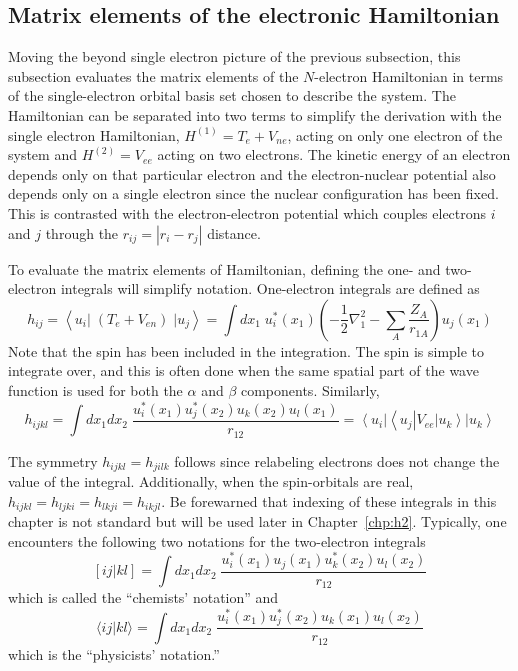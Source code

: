 \documentclass[11pt,oneside,final]{huthesis}%
\begin{document}
\subsection{Matrix elements of the electronic Hamiltonian}

Moving the beyond single electron picture of the previous subsection, this subsection evaluates the matrix elements of the $N$-electron Hamiltonian in terms of the single-electron orbital basis set chosen to describe the system.    The Hamiltonian can be separated into two terms to simplify the derivation with the single electron Hamiltonian, $H^{(1)} = T_{e} + V_{ne }$, acting on only one electron of the system and $H^{(2)} = V_{ee}$ acting on two electrons.  The kinetic energy of an electron depends only on that particular electron and the electron-nuclear potential also depends only on a single electron since the nuclear configuration has been fixed.  This is contrasted with the electron-electron potential which couples electrons $i$ and $j$ through the ${r}_{ij}=|r_i-r_j|$ distance.



To evaluate the matrix elements of Hamiltonian, defining the one- and two-electron integrals will simplify notation.  One-electron integrals are defined as 
\begin{equation} \label{GrindEQ__7_9_} 
h_{ij} =\left\langle u_{i} \left|\; \left(T_{e} +V_{en} \right)\; \right|u_{j} \right\rangle =\int  dx_{1} \; u_{i}^{*} (x_{1} )\left(-\frac{1}{2} \nabla _{1}^{2} -\sum _{A} \frac{Z_{A} }{r_{1A} } \right)u_{j} (x_{1} )
\end{equation} 
Note that the spin has been included in the integration.  The spin is simple to integrate over, and this is often done when the same spatial part of the wave function is used for both the $\alpha$ and $\beta$ components.  Similarly,
\begin{equation} \label{GrindEQ__7_10_} 
h_{ijkl} =\int  dx_{1} dx_{2} \; \frac{u_{i}^{*} (x_{1} )u_{j}^{*} (x_{2} )  u_{k} (x_{2} )u_{l} (x_{1} )}{r_{12} } ={\left\langle u_{i}  \right|} {\left\langle u_{j}  \right|} V_{ee} {\left| u_{k}  \right\rangle} {\left| u_{k}  \right\rangle} 
\end{equation} 


The symmetry $h_{ijkl} =h_{jilk}$ follows since relabeling electrons does not change the value of the integral. Additionally, when the spin-orbitals are real, $h_{ijkl}=h_{ljki}=h_{lkji}=h_{ikjl}$.  Be forewarned that indexing of these integrals in this chapter is not standard but will be used later in Chapter~\ref{chp:h2}.  Typically, one encounters the following two notations for the two-electron integrals
 \[ [ij|kl]=\int dx_1 dx_2 \;  \frac{u_{i}^*(x_1) u_j(x_1) u_k^*(x_2) u_l(x_2)}{r_{12}}\]
 which is called the ``chemists' notation'' and 
 \[\langle i j | k l \rangle=\int dx_1 dx_2\;\frac{u^*_i(x_1)u_j^*(x_2)   u_k(x_1) u_l(x_2) }{r_{12}}\]
which is the ``physicists' notation.''
 
\end{document}
